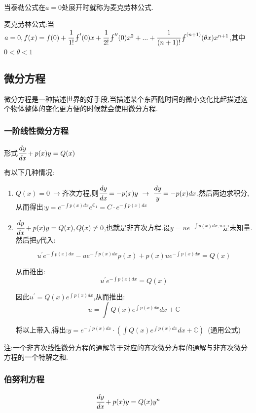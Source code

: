 \documentclass[UTF8,12pt]{ctexbook}
\newcommand{\derivative}{^\prime}
\newcommand{\doubleDerivative}{^{\prime\prime}}
\newcommand{\aLotDerivative}[1]{^{(#1)}}
\newcommand{\fDerivative}[1]{\fint\derivative(#1)}
\newcommand{\defFunction}[1]{f(#1)}
\newcommand{\mathConstant}{\mathbb{C}}
\begin{document}
{{{{当泰勒公式在$a = 0$处展开时就称为麦克劳林公式.

麦克劳林公式:当$a = 0, \defFunction{x} = \defFunction{0} + \cfrac{1}{1!}\fDerivative{0}x + \cfrac{1}{2!}\fint\doubleDerivative(0)x^2 + ... + \cfrac{1}{(n + 1)!}\fint\aLotDerivative{n + 1}(\theta x)x^{n+1}$,其中$0 < \theta < 1$

}%

}%

\subsection{微分方程}{
微分方程是一种描述世界的好手段,当描述某个东西随时间的微小变化比起描述这个物体整体的变化更方便的时候就会使用微分方程.

\subsubsection{一阶线性微分方程}{
  形式$\cfrac{dy}{dx} + p(x)y = Q(x)$

  有以下几种情况:
  \begin{enumerate}
    \item $Q(x) = 0\ \to$齐次方程,则$\cfrac{dy}{dx} = -p(x)y\ \to \ \cfrac{dy}{y} = -p(x)dx$,然后两边求积分,从而得出:$y = e^{-\int p(x)dx}e^{\mathConstant_1} = C \cdot e^{-\int p(x)dx}$
    \item {
          $\cfrac{dy}{dx} + p(x)y = Q(x), Q(x) \neq 0$,也就是非齐次方程.设$y = ue^{-\int p(x)dx, u}$是未知量.然后把$y$代入:

          $$
            u\derivative e^{-\int p(x)dx} - ue^{-\int p(x)dx}p(x) + p(x)ue^{-\int p(x)dx} = Q(x)
          $$

          从而推出:
          $$
            u\derivative e^{-\int p(x)dx} = Q(x)
          $$

          因此$u\derivative = Q(x)e^{\int p(x)dx}$,从而推出:
          $$
            u = \int Q(x)e^{\int p(x)dx}dx + \mathConstant
          $$

          将以上带入,得出:$y = e^{-\int p(x)dx}\cdot(\int Q(x)e^{\int p(x)dx}dx + \mathConstant)$\ (通用公式)
          }
  \end{enumerate}

  注:一个非齐次线性微分方程的通解等于对应的齐次微分方程的通解与非齐次微分方程的一个特解之和.

}%

\subsubsection{伯努利方程}{
  $$
    \cfrac{dy}{dx} + p(x)y = Q(x)y^n
  $$

}}}}
\end{document}
